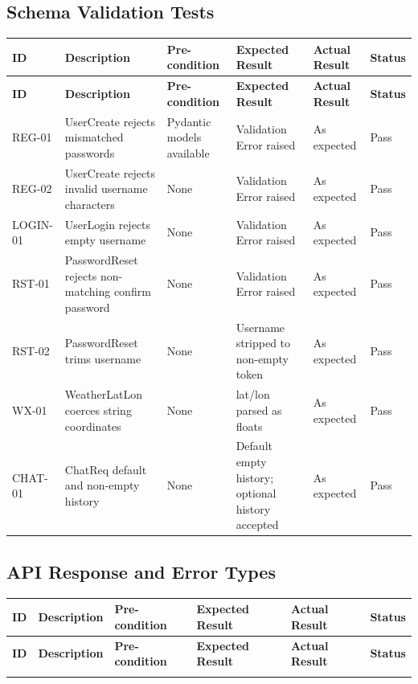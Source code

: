 \begin{appendices}
{\subsection*{Schema Validation Tests}
\begin{longtable}{|p{1.2cm}|p{3.0cm}|p{2.8cm}|p{3.2cm}|p{2.2cm}|p{1.1cm}|}
\hline
\textbf{ID} & \textbf{Description} & \textbf{Pre-condition} & \textbf{Expected Result} & \textbf{Actual Result} & \textbf{Status} \\
\hline
\endfirsthead
\hline
\textbf{ID} & \textbf{Description} & \textbf{Pre-condition} & \textbf{Expected Result} & \textbf{Actual Result} & \textbf{Status} \\
\hline
\endhead
\hline
\endfoot

REG-01 &
UserCreate rejects mismatched passwords &
Pydantic models available &
Validation Error raised &
As expected &
Pass \\
\hline

REG-02 &
UserCreate rejects invalid username characters &
None &
Validation Error raised &
As expected &
Pass \\
\hline

LOGIN-01 &
UserLogin rejects empty username &
None &
Validation Error raised &
As expected &
Pass \\
\hline

RST-01 &
PasswordReset rejects non-matching confirm password &
None &
Validation Error raised &
As expected &
Pass \\
\hline

RST-02 &
PasswordReset trims username &
None &
Username stripped to non-empty token &
As expected &
Pass \\
\hline

WX-01 &
WeatherLatLon coerces string coordinates &
None &
lat/lon parsed as floats &
As expected &
Pass \\
\hline

CHAT-01 &
ChatReq default and non-empty history &
None &
Default empty history; optional history accepted &
As expected &
Pass \\
\hline

\end{longtable}

\subsection*{API Response and Error Types}
\begin{longtable}{|p{1.2cm}|p{3.0cm}|p{2.8cm}|p{3.2cm}|p{2.2cm}|p{1.1cm}|}
\hline
\textbf{ID} & \textbf{Description} & \textbf{Pre-condition} & \textbf{Expected Result} & \textbf{Actual Result} & \textbf{Status} \\
\hline
\endfirsthead
\hline
\textbf{ID} & \textbf{Description} & \textbf{Pre-condition} & \textbf{Expected Result} & \textbf{Actual Result} & \textbf{Status} \\
\hline
\endhead
\hline
\endfoot


\end{longtable}}
\end{appendices}
